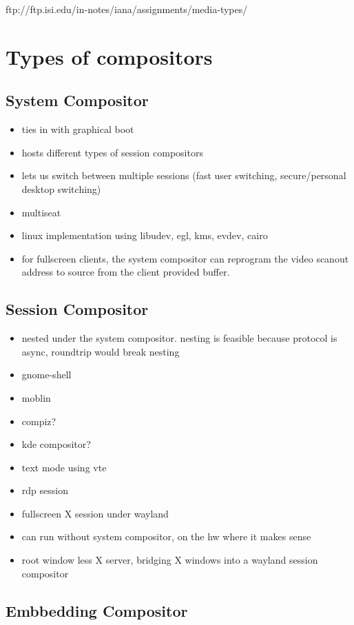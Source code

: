 \documentclass{article}
\begin{document}
ftp://ftp.isi.edu/in-notes/iana/assignments/media-types/


\section{Types of compositors}

\subsection{System Compositor}

\begin{itemize}
\item ties in with graphical boot
\item hosts different types of session compositors
\item lets us switch between multiple sessions (fast user switching,
   secure/personal desktop switching)
\item multiseat
\item linux implementation using libudev, egl, kms, evdev, cairo
\item for fullscreen clients, the system compositor can reprogram the
   video scanout address to source from the client provided buffer.
\end{itemize}

\subsection{Session Compositor}

\begin{itemize}
\item nested under the system compositor.  nesting is feasible because
   protocol is async, roundtrip would break nesting
\item gnome-shell
\item moblin
\item compiz?
\item kde compositor?
\item text mode using vte
\item rdp session
\item fullscreen X session under wayland
\item can run without system compositor, on the hw where it makes
   sense
\item root window less X server, bridging X windows into a wayland
   session compositor
\end{itemize}

\subsection{Embbedding Compositor}
\end{document}
